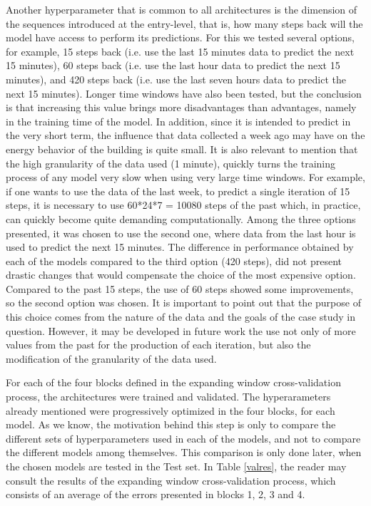 Another hyperparameter that is common to all architectures is the dimension of the sequences introduced at the entry-level, that is, how many steps back will the model have access to perform its predictions. For this we tested several options, for example, 15 steps back (i.e. use the last 15 minutes data to predict the next 15 minutes), 60 steps back (i.e. use the last hour data to predict the next 15 minutes), and 420 steps back (i.e. use the last seven hours data to predict the next 15 minutes).  Longer time windows have also been tested, but the conclusion is that increasing this value brings more disadvantages than advantages, namely in the training time of the model. In addition, since it is intended to predict in the very short term, the influence that data collected a week ago may have on the energy behavior of the building is quite small. It is also relevant to mention that the high granularity of the data used (1 minute), quickly turns the training process of any model very slow when using very large time windows. For example, if one wants to use the data of the last week, to predict a single iteration of 15 steps, it is necessary to use 60*24*7 = 10080 steps of the past which, in practice, can quickly become quite demanding computationally. Among the three options presented, it was chosen to use the second one, where data from the last hour is used to predict the next 15 minutes. The difference in performance obtained by each of the models compared to the third option (420 steps), did not present drastic changes that would compensate the choice of the most expensive option. Compared to the past 15 steps, the use of 60 steps showed some improvements, so the second option was chosen. It is important to point out that the purpose of this choice comes from the nature of the data and the goals of the case study in question. However, it may be developed in future work the use not only of more values from the past for the production of each iteration, but also the modification of the granularity of the data used.

For each of the four blocks defined in the expanding window cross-validation process, the architectures were trained and validated. The hyperarameters already mentioned were progressively optimized in the four blocks, for each model. As we know, the motivation behind this step is only to compare the different sets of hyperparameters used in each of the models, and not to compare the different models among themselves. This comparison is only done later, when the chosen models are tested in the Test set. In Table \ref{valres}, the reader may consult the results of the expanding window cross-validation process, which consists of an average of the errors presented in blocks 1, 2, 3 and 4.

